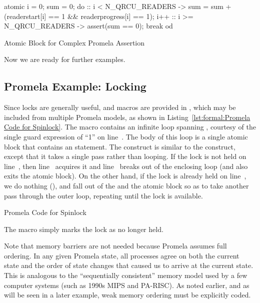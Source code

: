 \begin{listing}[tbp]
\begin{VerbatimL}
atomic {
	i = 0;
	sum = 0;
	do
	:: i < N_QRCU_READERS ->
		sum = sum + (readerstart[i] == 1 &&
		             readerprogress[i] == 1);
		i++
	:: i >= N_QRCU_READERS ->
		assert(sum == 0);
		break
	od
}
\end{VerbatimL}
\caption{Atomic Block for Complex Promela Assertion}
\label{lst:formal:Atomic Block for Complex Promela Assertion}
\end{listing}

Now we are ready for further examples.

\subsection{Promela Example: Locking}
\label{sec:formal:Promela Example: Locking}

\begin{fcvref}
Since locks are generally useful,  and
macros are provided in , which may be included from
multiple Promela models, as shown in
Listing~\ref{lst:formal:Promela Code for Spinlock}.
The  macro contains an infinite  loop
spanning ,
courtesy of the single guard expression of ``1'' on line~.
The body of this loop is a single atomic block that contains
an  statement.
The  construct is similar to the  construct, except
that it takes a single pass rather than looping.
If the lock is not held on line~, then
line~ acquires it and
line~ breaks out of the enclosing  loop (and also exits
the atomic block).
On the other hand, if the lock is already held on line~,
we do nothing (), and fall out of the  and the
atomic block so as to take another pass through the outer
loop, repeating until the lock is available.
\end{fcvref}

\begin{listing}[tbp]

\caption{Promela Code for Spinlock}
\label{lst:formal:Promela Code for Spinlock}
\end{listing}

The  macro simply marks the lock as no
longer held.

Note that memory barriers are not needed because Promela assumes
full ordering.
In any given Promela state, all processes agree on both the current
state and the order of state changes that caused us to arrive at
the current state.
This is analogous to the ``sequentially consistent'' memory model
used by a few computer systems (such as 1990s MIPS and PA-RISC).
As noted earlier, and as will be seen in a later example,
weak memory ordering must be explicitly coded.

